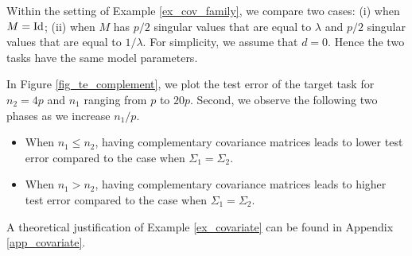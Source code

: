 \begin{example}\label{ex_covariate}
	Within the setting of Example \ref{ex_cov_family}, we compare two cases: (i) when $M = \operatorname{Id}$; (ii) when $M$ has $p/2$ singular values that are equal to $\lambda$ and $p/2$ singular values that are equal to $1 / \lambda$.
	For simplicity, we assume that $d = 0$.
	Hence the two tasks have the same model parameters.

	In Figure \ref{fig_te_complement}, we plot the test error of the target task for $n_2 = 4p$ and $n_1$ ranging from $p$ to $20p$.
	Second, we observe the following two phases as we increase $n_1 / p$.
	\begin{itemize}
		\item When $n_1 \le n_2$, having complementary covariance matrices leads to lower test error compared to the case when $\Sigma_1 = \Sigma_2$.
		\item When $n_1 > n_2$, having complementary covariance matrices leads to higher test error compared to the case when $\Sigma_1 = \Sigma_2$.
	\end{itemize}
\end{example}

A theoretical justification of Example \ref{ex_covariate} can be found in Appendix \ref{app_covariate}.


